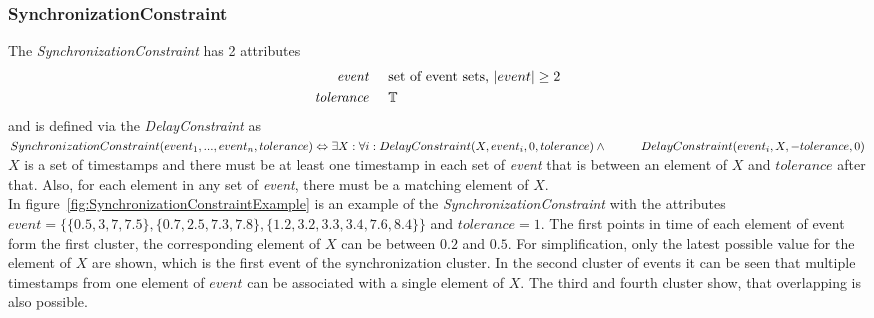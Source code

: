 	\subsubsection{SynchronizationConstraint}
		The \emph{SynchronizationConstraint} has 2 attributes
		\begin{align*}
			\emph{event} & \hspace{.5cm}\text{set of event sets, $|event|\geq 2$}\\
			\emph{tolerance} & \hspace{.5cm}\mathbb{T}
		\end{align*}
		and is defined via the \emph{DelayConstraint} as\\[10pt]
		\begin{math}
			SynchronizationConstraint ( event_1, ..., event_n, tolerance )\\
			\Leftrightarrow\exists X: \forall i: DelayConstraint(X, event_i, 0, tolerance) \land\\
			\text{\hspace{1cm}}DelayConstraint(event_i, X, -tolerance, 0)
		\end{math}\\[10pt]
		$X$ is a set of timestamps and there must be at least one timestamp in each set of \emph{event} that is between an element of $X$ and $tolerance$ after that. Also, for each element in any set of \emph{event}, there must be a matching element of $X$.\\
		In figure~\ref{fig:SynchronizationConstraintExample} is an example of the \emph{SynchronizationConstraint} with the attributes $event=\{\{0.5, 3, 7, 7.5\}, \{0.7, 2.5, 7.3, 7.8\}, \{1.2, 3.2, 3.3, 3.4, 7.6, 8.4\}\}$ and $tolerance = 1$. The first points in time of each element of event form the first cluster, the corresponding element of $X$ can be between $0.2$ and $0.5$. For simplification, only the latest possible value for the element of $X$ are shown, which is the first event of the synchronization cluster. In the second cluster of events it can be seen that multiple timestamps from one element of $event$ can be associated with a single element of $X$. The third and fourth cluster show, that overlapping is also possible.
